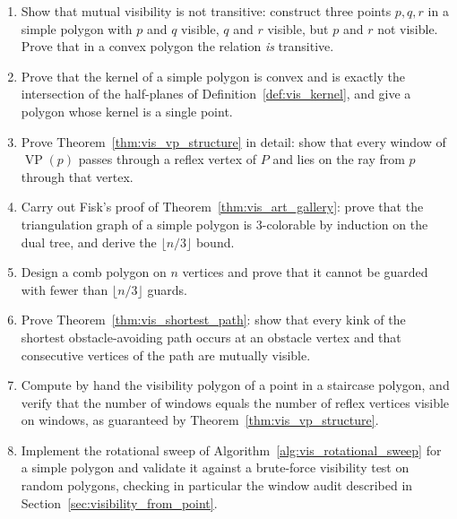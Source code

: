 \begin{enumerate}
  \item Show that mutual visibility is not transitive: construct three
    points $p, q, r$ in a simple polygon with $p$ and $q$ visible, $q$ and
    $r$ visible, but $p$ and $r$ not visible. Prove that in a convex polygon
    the relation \emph{is} transitive.
  \item Prove that the kernel of a simple polygon is convex and is exactly
    the intersection of the half-planes of Definition~\ref{def:vis_kernel},
    and give a polygon whose kernel is a single point.
  \item Prove Theorem~\ref{thm:vis_vp_structure} in detail: show that every
    window of $\operatorname{VP}(p)$ passes through a reflex vertex of $P$
    and lies on the ray from $p$ through that vertex.
  \item Carry out Fisk's proof of Theorem~\ref{thm:vis_art_gallery}: prove
    that the triangulation graph of a simple polygon is 3-colorable by
    induction on the dual tree, and derive the $\lfloor n/3 \rfloor$ bound.
  \item Design a comb polygon on $n$ vertices and prove that it cannot be
    guarded with fewer than $\lfloor n/3 \rfloor$ guards.
  \item Prove Theorem~\ref{thm:vis_shortest_path}: show that every kink of
    the shortest obstacle-avoiding path occurs at an obstacle vertex and
    that consecutive vertices of the path are mutually visible.
  \item Compute by hand the visibility polygon of a point in a staircase
    polygon, and verify that the number of windows equals the number of
    reflex vertices visible on windows, as guaranteed by
    Theorem~\ref{thm:vis_vp_structure}.
  \item Implement the rotational sweep of
    Algorithm~\ref{alg:vis_rotational_sweep} for a simple polygon and
    validate it against a brute-force visibility test on random polygons,
    checking in particular the window audit described in
    Section~\ref{sec:visibility_from_point}.
\end{enumerate}
